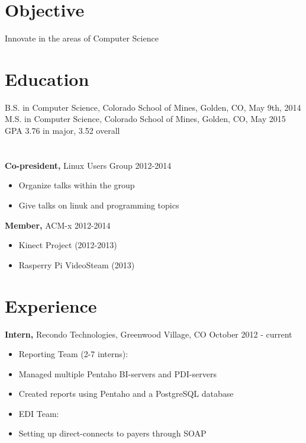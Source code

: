 \documentclass[margin]{res}
\begin{document}

\address{{\bf Present Address} \\ 266 Pinto St \\ Golden, CO 80401 }
\address{{\bf Contact Information} \\ (720) 219-7914 \\ gik0geck0@gmail.com \\ https://github.com/gik0geck0 }

\begin{resume}

\section{Objective}
Innovate in the areas of Computer Science

\section{Education}
B.S. in Computer Science, Colorado School of Mines, Golden, CO, May 9th, 2014 \\
M.S. in Computer Science, Colorado School of Mines, Golden, CO, May 2015 \\
GPA 3.76 in major, 3.52 overall
\section{}
{\bf Co-president,} Linux Users Group \hfill 2012-2014
    \begin{itemize} \itemsep -2pt
        \item Organize talks within the group
        \item Give talks on linuk and programming topics
    \end{itemize}

{\bf Member,} ACM-x \hfill 2012-2014
    \begin{itemize} \itemsep -2pt
        \item Kinect Project (2012-2013)
        \item Rasperry Pi VideoSteam (2013)
    \end{itemize}
\section{Experience}
 {\bf Intern,} Recondo Technologies, Greenwood Village, CO \hfill October 2012 - current
 \begin{itemize} \itemsep -2pt
     \item Reporting Team (2-7 interns):
     \item Managed multiple Pentaho BI-servers and PDI-servers
     \item Created reports using Pentaho and a PostgreSQL database
     \item EDI Team:
     \item Setting up direct-connects to payers through SOAP
 \end{itemize}


\end{resume}
\end{document}

